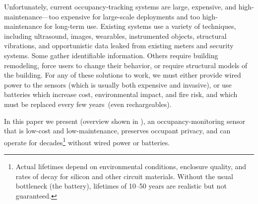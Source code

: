 Unfortunately, current occupancy-tracking systems are large, expensive, and high-maintenance---too expensive for large-scale deployments and too high-maintenance for long-term use.
%
Existing systems use a variety of techniques, including ultrasound\cite{hnat2012doorjamb}, images\cite{tyndall2016occupancy, teixeira2007lightweight}, wearables\cite{fishkin2005hands}, instrumented objects\cite{buettner2009activity}, structural vibrations\cite{pan2016occupant}, and opportunistic data leaked from existing meters and security systems\cite{yangoccupancy2014}.
Some gather identifiable information.
Others require building remodeling, force users to change their behavior, or require structural models of the building.
For any of these solutions to work, we must either provide wired power to the sensors (which is usually both expensive and invasive), or use batteries which increase cost, environmental impact, and fire risk, and which must be replaced every few years~(even rechargeables).

In this paper we present \sysname (overview shown in ), an occupancy-monitoring sensor that is low-cost and low-maintenance, preserves occupant privacy, and can operate for decades\footnote{Actual lifetimes depend on environmental conditions, enclosure quality, and rates of decay for silicon and other circuit materials. Without the usual bottleneck (the battery), lifetimes of 10--50 years are realistic but not guaranteed.} without wired power or batteries.
%


